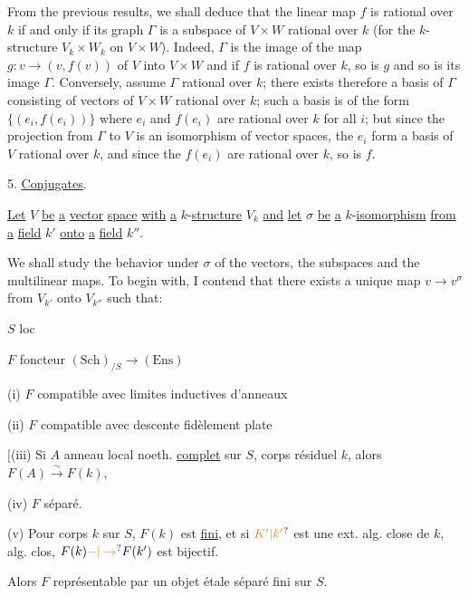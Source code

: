 From the previous results, we shall deduce that the linear map $f$ is
rational over $k$ if and only if its graph $\Gamma$ is a subspace of $V\times W$ rational over $k$
(for the $k$-structure $V_k\times W_k$ on $V\times W$). Indeed, $\Gamma$ is the image of the map
$g:v\longrightarrow(v,f(v))$ of $V$ into $V\times W$ and if $f$ is rational over $k$, so is $g$ and so is
its image $\Gamma$. Conversely, assume $\Gamma$ rational over $k$; there exists therefore a
basis of $\Gamma$ consisting of vectors of $V\times W$ rational over $k$; such a basis is of
the form $\{(e_i,f(e_i))\}$ where $e_i$ and $f(e_i)$ are rational over $k$ for all $i$; but since
the projection from $\Gamma$ to $V$ is an isomorphism of vector spaces, the $e_i$ form a
basis of $V$ rational over $k$, and since the $f(e_i)$ are rational over $k$, so is $f$.

5. \uline{Conjugates}.

\uline{Let} $V$ \uline{be} \uline{a} \uline{vector} \uline{space} \uline{with} \uline{a} $k$-\uline{structure} $V_k$ \uline{and} \uline{let} $\sigma$ \uline{be} \uline{a} $k$-\uline{isomorphism}
\uline{from} \uline{a} \uline{field} $k'$ \uline{onto} \uline{a} \uline{field} $k''$.

We shall study the behavior under $\sigma$ of the vectors, the subspaces and the
multilinear maps. To begin with, I contend that there exists a unique map
$v\longrightarrow v^\sigma$ from $V_{k'}$ onto $V_{k''}$ such that:

$S$  loc 

$F$ foncteur \quad $(\mathrm{Sch})_{/S}\longrightarrow(\mathrm{Ens})$

(i) $F$ compatible avec limites inductives d'anneaux

(ii) $F$ compatible avec descente fidèlement plate  

$\bigl[$(iii) Si $A$ anneau local noeth. \uline{complet} sur $S$,
corps résiduel $k$, alors $F(A)\overset{\sim}{\longrightarrow}F(k)$,

(iv) $F$ séparé.

(v) Pour  corps $k$ sur $S$, $F(k)$ est \uline{fini},
et si $\unsure{K'|k'}$ est une ext. alg. close de $k$,  alg. clos,
$F(k)\unsure{-|\to}F(k')$ est bijectif.

Alors $F$ représentable par un  objet
étale  séparé  fini sur $S$.

